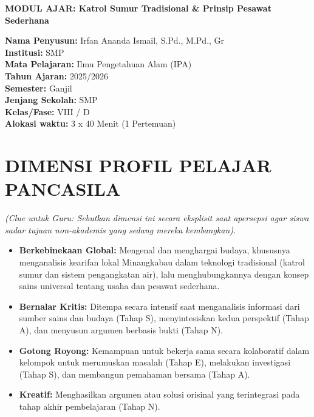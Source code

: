 \documentclass[a4paper,12pt]{article}
\begin{document}
\begin{center}
{\Large\textbf{MODUL AJAR: Katrol Sumur Tradisional \& Prinsip Pesawat Sederhana}}
\end{center}

\vspace{0.5cm}

\begin{tcolorbox}[mainbox]
\textbf{Nama Penyusun:} Irfan Ananda Ismail, S.Pd., M.Pd., Gr \\
\textbf{Institusi:} SMP \\
\textbf{Mata Pelajaran:} Ilmu Pengetahuan Alam (IPA) \\
\textbf{Tahun Ajaran:} 2025/2026 \\
\textbf{Semester:} Ganjil \\
\textbf{Jenjang Sekolah:} SMP \\
\textbf{Kelas/Fase:} VIII / D \\
\textbf{Alokasi waktu:} 3 x 40 Menit (1 Pertemuan)
\end{tcolorbox}

\section{DIMENSI PROFIL PELAJAR PANCASILA}
\textit{(Clue untuk Guru: Sebutkan dimensi ini secara eksplisit saat apersepsi agar siswa sadar tujuan non-akademis yang sedang mereka kembangkan).}

\begin{itemize}
\item \textbf{Berkebinekaan Global:} Mengenal dan menghargai budaya, khususnya menganalisis kearifan lokal Minangkabau dalam teknologi tradisional (katrol sumur dan sistem pengangkatan air), lalu menghubungkannya dengan konsep sains universal tentang usaha dan pesawat sederhana.
\item \textbf{Bernalar Kritis:} Ditempa secara intensif saat menganalisis informasi dari sumber sains dan budaya (Tahap S), menyintesiskan kedua perspektif (Tahap A), dan menyusun argumen berbasis bukti (Tahap N).
\item \textbf{Gotong Royong:} Kemampuan untuk bekerja sama secara kolaboratif dalam kelompok untuk merumuskan masalah (Tahap E), melakukan investigasi (Tahap S), dan membangun pemahaman bersama (Tahap A).
\item \textbf{Kreatif:} Menghasilkan argumen atau solusi orisinal yang terintegrasi pada tahap akhir pembelajaran (Tahap N).
\end{itemize}
\end{document}
